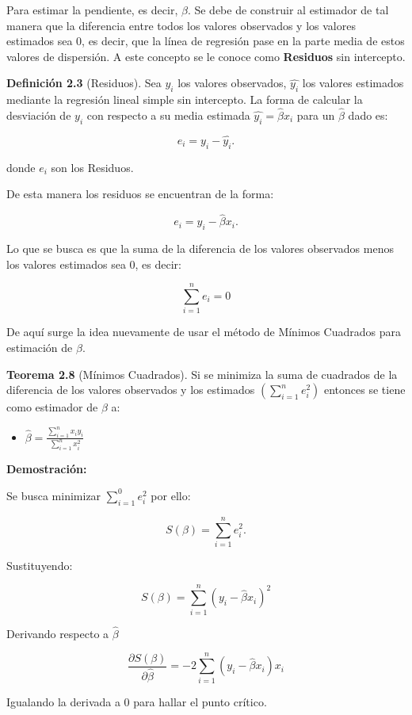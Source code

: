 \documentclass[
  a4paper,
  oneside,
  openany]{book}
\providecommand{\tightlist}{%
  \setlength{\itemsep}{0pt}\setlength{\parskip}{0pt}}
\begin{document}
Para estimar la pendiente, es decir, \(\beta.\) Se debe de construir al estimador de tal manera que la diferencia entre todos los valores observados y los valores estimados sea 0, es decir, que la línea de regresión pase en la parte media de estos valores de dispersión. A este concepto se le conoce como \textbf{Residuos} sin intercepto.

\textbf{Definición 2.3} (Residuos). Sea \(y_{i}\) los valores observados, \(\hat{y_{i}}\) los valores estimados mediante la regresión lineal simple sin intercepto. La forma de calcular la desviación de \(y_{i}\) con respecto a su media estimada \(\hat{y_{i}}=\hat{\beta}x_{i}\) para un \(\hat{\beta}\) dado es:

\[e_{i}= y_{i}-\hat{y_{i}}.\]

donde \(e_{i}\) son los Residuos.

De esta manera los residuos se encuentran de la forma:

\[e_{i}=y_{i}-\hat{\beta}x_{i}.\]

Lo que se busca es que la suma de la diferencia de los valores observados menos los valores estimados sea 0, es decir:

\[\sum_{i=1}^{n}e_{i}=0\]

De aquí surge la idea nuevamente de usar el método de Mínimos Cuadrados para estimación de \(\beta.\)

\textbf{Teorema 2.8} (Mínimos Cuadrados).
Si se minimiza la suma de cuadrados de la diferencia de los valores observados y los estimados \(\left(\sum_{i=1}^{n}e_{i}^2\right)\) entonces se tiene como estimador de \(\beta\) a:

\begin{itemize}
\tightlist
\item
  \(\hat{\beta}=\frac{\sum_{i=1}^{n}x_{i}y_{i}}{\sum_{i=1}^{n}x_{i}^2}\)
\end{itemize}

\textbf{Demostración:}

Se busca minimizar \(\sum_{i=1}^{0}e_{i}^2\) por ello:

\[S(\beta)=\sum_{i=1}^{n}e_{i}^2.\]

Sustituyendo:

\[S(\beta)=\sum_{i=1}^{n}\left( y_{i}-\hat{\beta}x_{i}\right)^2\]

Derivando respecto a \(\hat{\beta}\)

\[\frac{\partial S(\beta)}{\partial \hat{\beta}}=-2\sum_{i=1}^{n}\left(y_{i}-\hat{\beta}x_{i}\right)x_{i}\]

Igualando la derivada a 0 para hallar el punto crítico.
\end{document}
